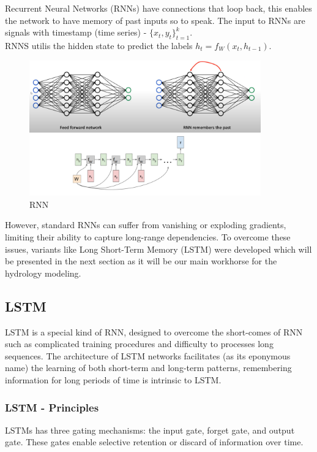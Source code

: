 \documentclass[12pt]{report}
\begin{document}
Recurrent Neural Networks (RNNs) have connections that loop back, this enables the network to have memory of past inputs so to speak. The input to RNNs are signals with timestamp (time series) - $\{x_t, y_t \}_{t=1}^k$.\\

RNNS utilis the hidden state to predict the labels $h_t = f_{W}(x_t, h_{t-1})$.\\
\begin{figure}[H]\centering\includegraphics[width=10cm]{RNN.png}\caption{RNN}\end{figure}


However, standard RNNs can suffer from vanishing or exploding gradients, limiting their ability to capture long-range dependencies. To overcome these issues, variants like Long Short-Term Memory (LSTM) were developed which will be presented in the next section as it will be our main workhorse for the hydrology modeling.
\newpage

\subsection{LSTM }

LSTM is a special kind of RNN, designed to overcome the short-comes of RNN such as complicated training procedures and  difficulty to processes long sequences. The architecture of LSTM networks facilitates (as its eponymous name) the learning of both short-term and long-term patterns, remembering information for long periods of time is intrinsic to LSTM.

\subsubsection{LSTM - Principles}

LSTMs has three gating mechanisms: the input gate, forget gate, and output gate. These gates enable selective retention or discard of information over time.\\
\end{document}
